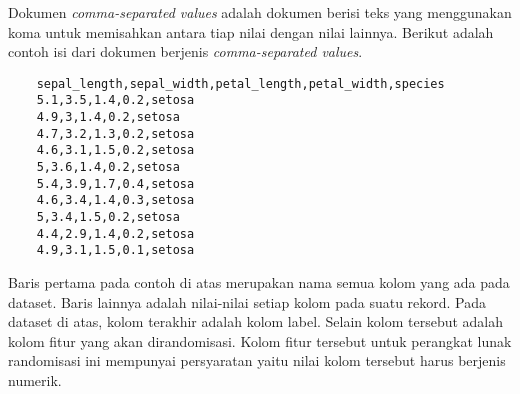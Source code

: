 Dokumen \textit{comma-separated values} adalah dokumen berisi teks yang menggunakan koma untuk memisahkan antara tiap nilai dengan nilai lainnya. Berikut adalah contoh isi dari dokumen berjenis \textit{comma-separated values}.
\begin{verbatim}
	sepal_length,sepal_width,petal_length,petal_width,species
	5.1,3.5,1.4,0.2,setosa
	4.9,3,1.4,0.2,setosa
	4.7,3.2,1.3,0.2,setosa
	4.6,3.1,1.5,0.2,setosa
	5,3.6,1.4,0.2,setosa
	5.4,3.9,1.7,0.4,setosa
	4.6,3.4,1.4,0.3,setosa
	5,3.4,1.5,0.2,setosa
	4.4,2.9,1.4,0.2,setosa
	4.9,3.1,1.5,0.1,setosa
\end{verbatim}
Baris pertama pada contoh di atas merupakan nama semua kolom yang ada pada dataset. Baris lainnya adalah nilai-nilai setiap kolom pada suatu rekord. Pada dataset di atas, kolom terakhir adalah kolom label. Selain kolom tersebut adalah kolom fitur yang akan dirandomisasi. Kolom fitur tersebut untuk perangkat lunak randomisasi ini mempunyai persyaratan yaitu nilai kolom tersebut harus berjenis numerik.
